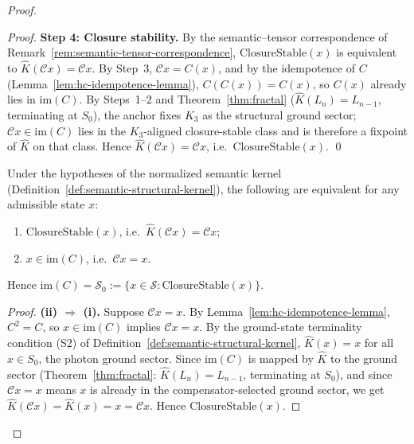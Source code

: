 \begin{proof}
\begin{proof}
\smallskip
\noindent\textbf{Step 4: Closure stability.}
By the semantic--tensor correspondence of
Remark~\ref{rem:semantic-tensor-correspondence},
$\mathrm{ClosureStable}(x)$ is equivalent to
$\hat{K}(\mathcal{C}x) = \mathcal{C}x$.
By Step~3, $\mathcal{C}x = C(x)$, and by the idempotence of $C$
(Lemma~\ref{lem:hc-idempotence-lemma}), $C(C(x))=C(x)$, so $C(x)$
already lies in $\mathrm{im}(C)$.
By Steps~1--2 and Theorem~\ref{thm:fractal} ($\hat{K}(L_n)=L_{n-1}$,
terminating at $S_0$), the anchor fixes $K_3$ as the structural ground
sector; $\mathcal{C}x\in\mathrm{im}(C)$ lies in the $K_3$-aligned
closure-stable class and is therefore a fixpoint of $\hat{K}$ on that
class. Hence $\hat{K}(\mathcal{C}x)=\mathcal{C}x$, i.e.\ $\mathrm{ClosureStable}(x)$. \qed
\end{proof}

\begin{lemma}
\label{lem:closure-stable-iff-im-C}
Under the hypotheses of the normalized semantic kernel
(Definition~\ref{def:semantic-structural-kernel}), the following are equivalent
for any admissible state $x$:
\begin{enumerate}[label=(\roman*)]
  \item $\mathrm{ClosureStable}(x)$, i.e.\ $\hat{K}(\mathcal{C}x)=\mathcal{C}x$;
  \item $x \in \mathrm{im}(C)$, i.e.\ $\mathcal{C}x = x$.
\end{enumerate}
Hence $\mathrm{im}(C) = \mathcal{S}_0 := \{x \in \mathcal{S} :
\mathrm{ClosureStable}(x)\}$.
\end{lemma}

\begin{proof}
\textbf{(ii) $\Rightarrow$ (i).}
Suppose $\mathcal{C}x = x$. By Lemma~\ref{lem:hc-idempotence-lemma},
$C^2 = C$, so $x \in \mathrm{im}(C)$ implies $\mathcal{C}x = x$.
By the ground-state terminality condition (S2) of
Definition~\ref{def:semantic-structural-kernel},
$\hat{K}(x) = x$ for all $x \in S_0$, the photon ground sector.
Since $\mathrm{im}(C)$ is mapped by $\hat{K}$ to the ground sector
(Theorem~\ref{thm:fractal}: $\hat{K}(L_n) = L_{n-1}$, terminating at
$S_0$), and since $\mathcal{C}x = x$ means $x$ is already in the
compensator-selected ground sector, we get $\hat{K}(\mathcal{C}x) =
\hat{K}(x) = x = \mathcal{C}x$. Hence $\mathrm{ClosureStable}(x)$.


\end{proof}
\end{proof}
